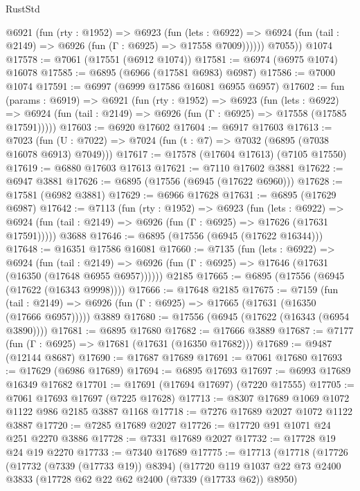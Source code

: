 \begin{lexlean}{RustStd}
\begin{coremodule}
          @6921
            (fun (rty : @1952) =>
            @6923
              (fun (lets : @6922) =>
              @6924 (fun (tail : @2149) => @6926 (fun (Γ : @6925) => @17558 @7009))))))
        @7055))
    @1074
@17578 := @7061 (@17551 (@6912 @1074))
@17581 := @6974 (@6975 @1074) @16078
@17585 := @6895 (@6966 (@17581 @6983) @6987)
@17586 := @7000 @1074
@17591 := @6997 (@6999 @17586 @16081 @6955 @6957)
@17602 := fun (params : @6919) =>
  @6921
    (fun (rty : @1952) =>
    @6923
      (fun (lets : @6922) =>
      @6924 (fun (tail : @2149) => @6926 (fun (Γ : @6925) => @17558 (@17585 @17591)))))
@17603 := @6920 @17602
@17604 := @6917 @17603
@17613 := @7023
    (fun (U : @7022) => @7024 (fun (t : @7) => @7032 (@6895 (@7038 @16078 @6913) @7049)))
@17617 := @17578 (@17604 @17613) (@7105 @17550)
@17619 := @6880 @17603 @17613
@17621 := @7110 @17602 @3881
@17622 := @6947 @3881
@17626 := @6895 (@17556 (@6945 (@17622 @6960)))
@17628 := @17581 (@6982 @3881)
@17629 := @6966 @17628
@17631 := @6895 (@17629 @6987)
@17642 := @7113
    (fun (rty : @1952) =>
    @6923
      (fun (lets : @6922) =>
      @6924 (fun (tail : @2149) => @6926 (fun (Γ : @6925) => @17626 (@17631 @17591)))))
    @3688
@17646 := @6895 (@17556 (@6945 (@17622 @16344)))
@17648 := @16351 @17586 @16081
@17660 := @7135
    (fun (lets : @6922) =>
    @6924
      (fun (tail : @2149) =>
      @6926 (fun (Γ : @6925) => @17646 (@17631 (@16350 (@17648 @6955 @6957))))))
    @2185
@17665 := @6895 (@17556 (@6945 (@17622 (@16343 @9998))))
@17666 := @17648 @2185
@17675 := @7159
    (fun (tail : @2149) => @6926 (fun (Γ : @6925) => @17665 (@17631 (@16350 (@17666 @6957)))))
    @3889
@17680 := @17556 (@6945 (@17622 (@16343 (@6954 @3890))))
@17681 := @6895 @17680
@17682 := @17666 @3889
@17687 := @7177 (fun (Γ : @6925) => @17681 (@17631 (@16350 @17682)))
@17689 := @9487 (@12144 @8687)
@17690 := @17687 @17689
@17691 := @7061 @17680
@17693 := @17629 (@6986 @17689)
@17694 := @6895 @17693
@17697 := @6993 @17689 @16349 @17682
@17701 := @17691 (@17694 @17697) (@7220 @17555)
@17705 := @7061 @17693 @17697 (@7225 @17628)
@17713 := @8307 @17689 @1069 @1072 @1122 @986 @2185 @3887 @1168
@17718 := @7276 @17689 @2027 @1072 @1122 @3887
@17720 := @7285 @17689 @2027
@17726 := @17720 @91 @1071 @24 @251 @2270 @3886
@17728 := @7331 @17689 @2027
@17732 := @17728 @19 @24 @19 @2270
@17733 := @7340 @17689
@17775 := @17713
    (@17718
      (@17726
        (@17732 (@7339 (@17733 @19)) @8394)
        (@17720
          @119
          @1037
          @22
          @73
          @2400
          @3833
          (@17728 @62 @22 @62 @2400 (@7339 (@17733 @62)) @8950)

\end{coremodule}
\end{lexlean}
